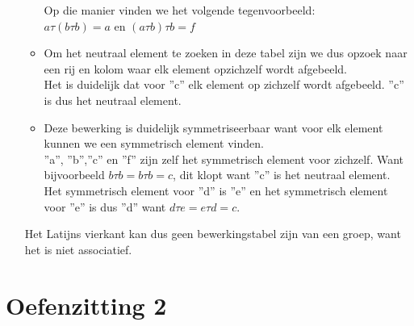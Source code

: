 \documentclass[11pt,a4paper,titlepage]{article}
\begin{document}
\begin{enumerate}[label=(\alph*)]
\begin{itemize}
	Op die manier vinden we het volgende tegenvoorbeeld:\\
	$a \tau (b \tau b) = a $ en $(a \tau b) \tau b =f$  \\
			\item Om het neutraal element te zoeken in deze tabel zijn we dus opzoek naar een rij en kolom waar elk element opzichzelf wordt afgebeeld. \\
				Het is duidelijk dat voor ''c'' elk element op zichzelf wordt afgebeeld. ''c'' is dus het neutraal element.
			\item Deze bewerking is duidelijk symmetriseerbaar want voor elk element kunnen we een symmetrisch element vinden. \\
				''a'', ''b'',''c'' en ''f'' zijn zelf het symmetrisch element voor zichzelf. Want bijvoorbeeld $ b \tau b = b \tau b = c$, dit klopt want ''c'' is het neutraal element. \\ Het symmetrisch element voor ''d'' is ''e'' en het symmetrisch element voor ''e'' is dus ''d'' want $d \tau e = e \tau d =  c$.
		\end{itemize}
		Het Latijns vierkant kan dus geen bewerkingstabel zijn van een groep, want het is niet associatief.
\end{enumerate}
\newpage
\section{Oefenzitting 2}
\end{document}
